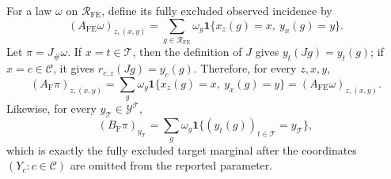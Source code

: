 For a law \(\omega\) on \(\mathcal R_{\mathrm{FE}}\), define its fully excluded observed incidence by
\[
(A_{\mathrm{FE}}\omega)_{z,(x,y)}
=\sum_{g\in\mathcal R_{\mathrm{FE}}}
\omega_g\mathbf 1\{x_z(g)=x,\ y_x(g)=y\}.
\]
Let \(\pi=J_{\#}\omega\).  If \(x=t\in\mathcal T\), then the definition of \(J\) gives \(y_t(Jg)=y_t(g)\); if \(x=c\in\mathcal C\), it gives \(r_{c,z}(Jg)=y_c(g)\).  Therefore, for every \(z,x,y\),
\[
(A_{\mathrm F}\pi)_{z,(x,y)}
=\sum_g\omega_g\mathbf 1\{x_z(g)=x,\ y_x(g)=y\}
=(A_{\mathrm{FE}}\omega)_{z,(x,y)}.
\]
Likewise, for every \(y_{\mathcal T}\in\mathcal Y^{\mathcal T}\),
\[
(B_{\mathrm F}\pi)_{y_{\mathcal T}}
=\sum_g\omega_g
\mathbf 1\{(y_t(g))_{t\in\mathcal T}=y_{\mathcal T}\},
\]
which is exactly the fully excluded target marginal after the coordinates \((Y_c:c\in\mathcal C)\) are omitted from the reported parameter.

